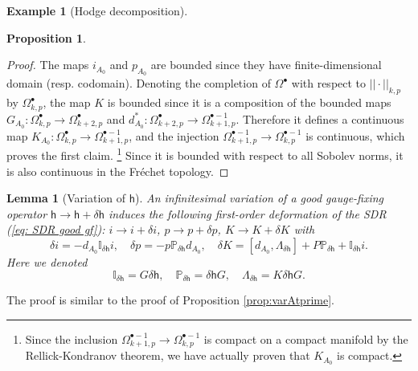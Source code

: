 \documentclass[11pt,a4paper]{amsart}
\theoremstyle{plain} %
\newtheorem{lem}[thm]{Lemma}
\newtheorem{prop}[thm]{Proposition}
\theoremstyle{definition}
\newtheorem{expl}[thm]{Example}
\theoremstyle{remark}
\newcommand{\bt}{\bullet}
\newcommand{\ra}{\rightarrow}
\newcommand{\sh}{\mathsf{h}}
\begin{document}
{\begin{expl}[Hodge decomposition]
\begin{prop}
\end{prop}
\begin{proof}
The maps $i_{A_0}$ and $p_{A_0}$ are bounded since they have finite-dimensional domain (resp. codomain). %
Denoting the completion of $\Omega^\bullet$ with respect to $||\cdot||_{k,p}$ by $\Omega^\bullet_{k,p}$, the map $K$ is bounded since it is a composition of the bounded maps $G_{A_0} \colon \Omega^\bullet_{k,p} \to \Omega^\bullet_{k+2,p}$ and $d^*_{A_0}\colon \Omega^\bullet_{k+2,p} \to \Omega^{\bullet -1}_{k+1,p}$. Therefore it defines a continuous map $K_{A_0}\colon\Omega^\bullet_{k,p} \to \Omega^{\bullet -1}_{k+1,p}$, and the injection $\Omega^{\bullet -1}_{k+1,p} \to \Omega^{\bullet -1}_{k,p}$ is continuous, which proves the first claim. \footnote{Since the inclusion $\Omega^{\bullet -1}_{k+1,p} \to \Omega^{\bullet -1}_{k,p}$ is compact on a compact manifold by the Rellick-Kondranov theorem, we have actually proven that $K_{A_0}$ is compact. } Since it is bounded with respect to all Sobolev norms, it is also continuous in the Fr\'echet topology. 
\end{proof}
\end{expl}
\begin{lem}[Variation of $\sh$]
    An infinitesimal variation of a good gauge-fixing operator $\sh\ra \sh+\delta\sh$ induces the  following first-order deformation of the SDR (\ref{eq: SDR good gf}): $i\ra i+\delta i$, $p\ra p+\delta p$, $K\ra K+\delta K$ with
\begin{equation}
    \delta i=-d_{A_0} \mathbb{I}_{\delta\sh} i,\quad \delta p =-p \mathbb{P}_{\delta\sh} d_{A_0},\quad \delta K= [d_{A_0},\Lambda_{\delta \sh}]+P \mathbb{P}_{\delta\sh}+\mathbb{I}_{\delta \sh}i.
\end{equation}
Here we denoted
\begin{equation}
    \mathbb{I}_{\delta\sh}=G\delta\sh,\quad \mathbb{P}_{\delta\sh}=\delta\sh G,\quad 
    \Lambda_{\delta\sh}=K\delta\sh G.
\end{equation}
\end{lem}
The proof is similar to the proof of Proposition \ref{prop:varAtprime}.

}
\end{document}
